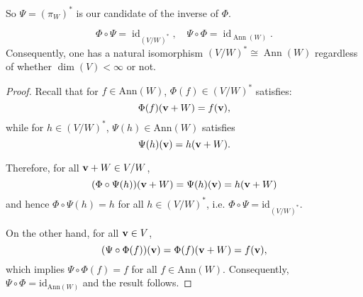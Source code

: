 So $\Psi = (\pi_W)^*$ is our candidate of the inverse of $\Phi$. 


\begin{theorem}
\[
\Phi \circ \Psi = \operatorname{id}_{(V/W)^*}, \quad \Psi \circ \Phi = \operatorname{id}_{\operatorname{Ann}(W)}.
\]
Consequently, one has a natural isomorphism $(V/W)^* \cong \operatorname{Ann}(W)$ regardless of whether $\dim(V) < \infty$ or not.
\end{theorem}
\begin{proof}
    Recall that for $f \in \mathrm{Ann}(W)$, $\Phi(f) \in (V/W)^*$ satisfies:
    $$\Phi(f)({\bf v}+W) = f({\bf v}),$$ 
    while for $h \in (V/W)^*$, $\Psi(h) \in \mathrm{Ann}(W)$ satisfies
    $$\Psi(h)({\bf v}) = h({\bf v}+W).$$

    Therefore, for all ${\bf v} +W \in V/W$,
    $$(\Phi \circ \Psi(h))({\bf v} + W) = \Psi(h)({\bf v}) = h({\bf v}+W)$$
    and hence $\Phi \circ \Psi(h) = h$ for all $h \in (V/W)^*$, i.e. $\Phi \circ \Psi = \mathrm{id}_{(V/W)^*}$.

    On the other hand, for all ${\bf v} \in V$,
    $$(\Psi \circ \Phi(f))({\bf v}) = \Phi(f)({\bf v} + W) = f({\bf v}),$$
    which implies $\Psi \circ \Phi(f) = f$ for all $f \in \mathrm{Ann}(W)$. Consequently, $\Psi \circ \Phi = \mathrm{id}_{\mathrm{Ann}(W)}$ and the result follows.
\end{proof}






